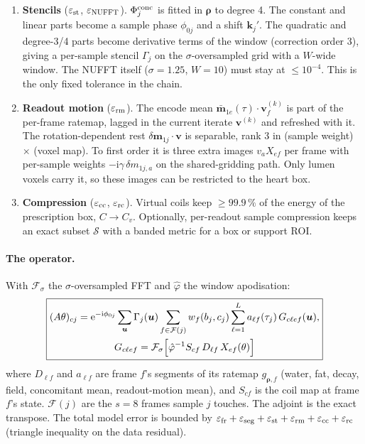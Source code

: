 \documentclass[11pt]{article}
\theoremstyle{remark}
\newcommand{\pp}{\bm\rho}
\newcommand{\kk}{\bm k}
\newcommand{\uu}{\bm u}
\newcommand{\vv}{\bm v}
\newcommand{\ii}{\mathrm i}
\newcommand{\ee}{\mathrm e}
\newcommand{\Fs}{\mathcal F_\sigma}
\begin{document}
\begin{enumerate}
Memory: $L|\Omega|$ diagonals per frame, or the ratemap (about 16 B per voxel and frame) with the diagonals formed on the fly in the pad step at fixed node times.
\item \textbf{Stencils} ($\varepsilon_{\rm st}$, $\varepsilon_{\rm NUFFT}$). $\Phi^{\rm conc}_j$ is fitted in $\pp$ to degree 4. The constant and linear parts become a sample phase $\phi_{0j}$ and a shift $\kk_j'$. The quadratic and degree-3/4 parts become derivative terms of the window (correction order 3), giving a per-sample stencil $\Gamma_j$ on the $\sigma$-oversampled grid with a $W$-wide window. The NUFFT itself ($\sigma=1.25$, $W=10$) must stay at $\le10^{-4}$. This is the only fixed tolerance in the chain.
\item \textbf{Readout motion} ($\varepsilon_{\rm rm}$). The encode mean $\bar{\bm m}_{1e}(\tau)\cdot\vv^{(k)}_f$ is part of the per-frame ratemap, lagged in the current iterate $\vv^{(k)}$ and refreshed with it. The rotation-dependent rest $\delta\bm m_{1j}\cdot\vv$ is separable, rank 3 in (sample weight) $\times$ (voxel map). To first order it is three extra images $v_aX_{ef}$ per frame with per-sample weights $-\ii\gamma\,\delta m_{1j,a}$ on the shared-gridding path. Only lumen voxels carry it, so these images can be restricted to the heart box.
\item \textbf{Compression} ($\varepsilon_{\rm cc}$, $\varepsilon_{\rm rc}$). Virtual coils keep $\ge99.9\,\%$ of the energy of the prescription box, $C\to C_v$. Optionally, per-readout sample compression keeps an exact subset $\mathcal S$ with a banded metric for a box or support ROI.
\end{enumerate}

\paragraph{The operator.} With $\Fs$ the $\sigma$-oversampled FFT and $\hat\varphi$ the window apodisation:
\begin{equation}
\boxed{\begin{gathered}
(A\theta)_{cj}=\ee^{-\ii\phi_{0j}}\sum_{\uu}\Gamma_j(\uu)\sum_{f\in\mathcal F(j)}w_f(b_j,c_j)\sum_{\ell=1}^La_{\ell f}(\tau_j)\,G_{c\ell ef}(\uu),\\
G_{c\ell ef}=\Fs\Bigl[\hat\varphi^{-1}S_{cf}\,D_{\ell f}\,X_{ef}(\theta)\Bigr]
\end{gathered}}
\label{eq:op}
\end{equation}
where $D_{\ell f}$ and $a_{\ell f}$ are frame $f$'s segments of its ratemap $g_{\pp,f}$ (water, fat, decay, field, concomitant mean, readout-motion mean), and $S_{cf}$ is the coil map at frame $f$'s state. $\mathcal F(j)$ are the $s=8$ frames sample $j$ touches. The adjoint is the exact transpose. The total model error is bounded by $\varepsilon_{\rm fr}+\varepsilon_{\rm seg}+\varepsilon_{\rm st}+\varepsilon_{\rm rm}+\varepsilon_{\rm cc}+\varepsilon_{\rm rc}$ (triangle inequality on the data residual).
\end{document}
